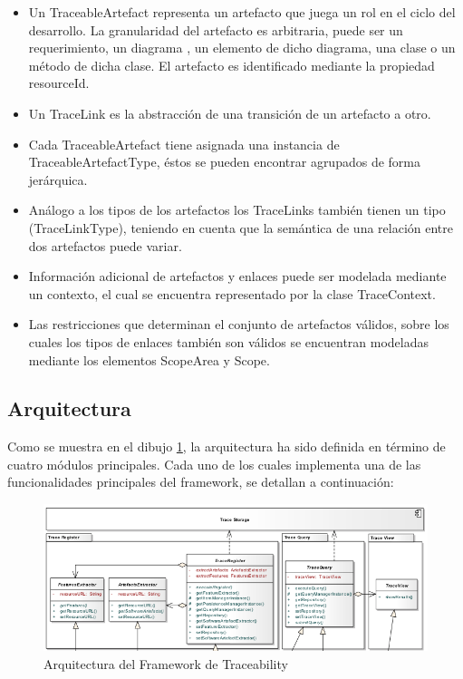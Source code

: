 \documentclass[a4paper,12pt,oneside,spanish]{book}
\begin{document}
\begin{itemize}
\item Un TraceableArtefact representa un artefacto que juega un rol en el ciclo del desarrollo. La granularidad del artefacto es arbitraria, puede ser un requerimiento, un diagrama , un elemento de dicho diagrama, una clase o un método de dicha clase. El artefacto es identificado mediante la propiedad resourceId.
\item Un TraceLink es la abstracción de una transición de un artefacto a otro.
\item Cada TraceableArtefact tiene asignada una instancia de TraceableArtefactType, éstos se pueden encontrar agrupados de forma jerárquica.
 \item Análogo a los tipos de los artefactos los TraceLinks también tienen un tipo (TraceLinkType), teniendo en cuenta que la semántica de una relación entre dos artefactos puede variar.
\item Información adicional de artefactos y enlaces puede ser modelada mediante un contexto, el cual se encuentra representado por la clase TraceContext.
\item Las restricciones que determinan el conjunto de artefactos válidos, sobre los cuales los tipos de enlaces también son válidos se encuentran modeladas mediante los elementos ScopeArea y Scope.
\end{itemize}

\subsection{Arquitectura}

Como se muestra en el dibujo \ref{fig:SPLArquitectura}, la arquitectura ha sido definida en término de cuatro módulos principales. Cada uno de los cuales implementa una de las funcionalidades principales del framework, se detallan a continuación:

\begin{figure}[hbtp]
\centering
\includegraphics[scale=.55]{./img/ArquitecturaTraceabilityFramework}
\caption{Arquitectura del Framework de Traceability}
\label{fig:SPLArquitectura}
\end{figure}
\end{document}
